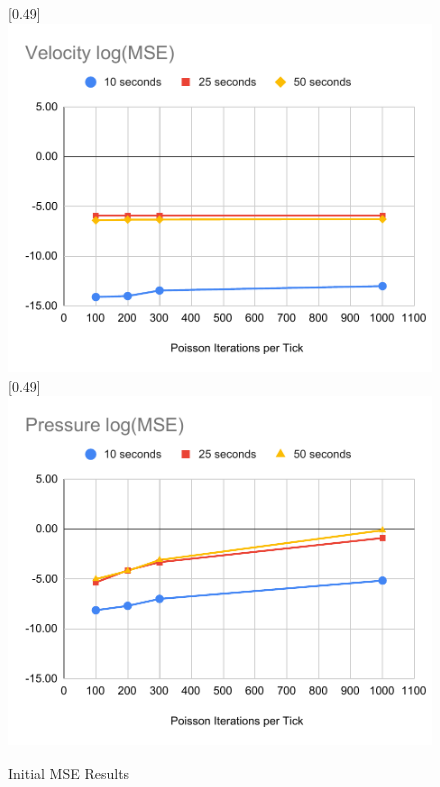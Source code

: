 \begin{figure}
    \centering
    [0.49\linewidth]{\includegraphics[width=\linewidth]{Ch62Results/figures/temp_velocity_mse.pdf}
    }%
    [0.49\linewidth]{\includegraphics[width=\linewidth]{Ch62Results/figures/temp_pressure_mse.pdf}
    }    
    
    \caption{Initial MSE Results}
    \label{fig:results:mse_initial}
\end{figure}